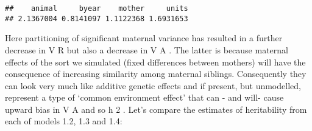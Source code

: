 \documentclass[
  12pt,
]{book}
\newenvironment{Shaded}{\begin{snugshade}}{\end{snugshade}}
\newcommand{\AttributeTok}[1]{\textcolor[rgb]{0.77,0.63,0.00}{#1}}
\newcommand{\ConstantTok}[1]{\textcolor[rgb]{0.00,0.00,0.00}{#1}}
\newcommand{\DecValTok}[1]{\textcolor[rgb]{0.00,0.00,0.81}{#1}}
\newcommand{\FloatTok}[1]{\textcolor[rgb]{0.00,0.00,0.81}{#1}}
\newcommand{\FunctionTok}[1]{\textcolor[rgb]{0.00,0.00,0.00}{#1}}
\newcommand{\NormalTok}[1]{#1}
\newcommand{\OtherTok}[1]{\textcolor[rgb]{0.56,0.35,0.01}{#1}}
\newcommand{\SpecialCharTok}[1]{\textcolor[rgb]{0.00,0.00,0.00}{#1}}
\begin{document}
\begin{Shaded}
\end{Shaded}

\begin{verbatim}
##    animal     byear    mother     units 
## 2.1367004 0.8141097 1.1122368 1.6931653
\end{verbatim}

Here partitioning of significant maternal variance has resulted in a further decrease in V R but also a decrease in V A . The latter is because maternal effects of the sort we simulated (fixed differences between mothers) will have the consequence of increasing similarity among maternal siblings. Consequently they can look very much like additive genetic effects and if present, but unmodelled, represent a type of `common environment effect' that can - and will- cause upward bias in V A and so h 2 . Let's compare the estimates of heritability from each of models 1.2, 1.3 and 1.4:
\end{document}
